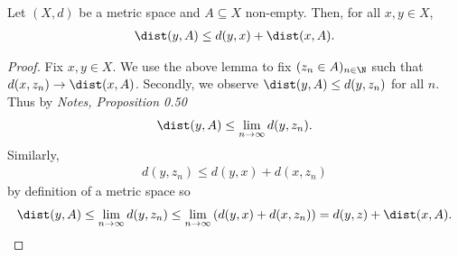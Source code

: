 \documentclass{article}
\begin{document}
\begin{claim*}[4]
   Let $(X,d)$ be a metric space and $A\subseteq X$ non-empty. Then, for all $x,y\in X$, 
   \begin{align*}
      \dist(y,A)\leq d(y,x)+\dist(x,A).
   \end{align*}
   \begin{proof}
      Fix $x,y\in X$.
      We use the above lemma to fix $(z_n\in A)_{n\in\N}$ such that $d(x,z_n)\to\dist(x,A)$.
      Secondly, we observe $\dist(y,A)\leq d(y,z_n)$ for all $n$. Thus 
      by \emph{Notes, Proposition 0.50}
      \begin{align*}
         \dist(y,A)\leq\lim_{n\to\infty} d(y,z_n). 
      \end{align*}
      Similarly, 
      \begin{align*}
         d(y,z_n) \leq d(y,x) + d(x,z_n)
      \end{align*}
      by definition of a metric space so 
      \begin{align*}
         \dist(y,A)  \leq\lim_{n\to\infty} d(y,z_n) 
                     \leq \lim_{n\to\infty}\left(d(y,x)+d(x,z_n)\right)
                     =d(y,z)+\dist(x,A).
      \end{align*}
   \end{proof}
\end{claim*}
\end{document}
